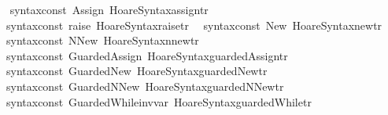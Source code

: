 \begin{isabellebody}
{\isacartoucheclose}\isanewline
\isanewline
\isanewline
\isanewline
{}\isamarkupfalse%
\ {\isacartoucheopen}\isanewline
\ {\isacharbrackleft}{\isacharparenleft}{\isacharat}{\isacharbraceleft}syntax{\isacharunderscore}const\ {\isachardoublequote}{\isacharunderscore}Assign{\isachardoublequote}{\isacharbraceright}{\isacharcomma}\ Hoare{\isacharunderscore}Syntax{\isachardot}assign{\isacharunderscore}tr{\isacharparenright}{\isacharcomma}\isanewline
\ \ {\isacharparenleft}{\isacharat}{\isacharbraceleft}syntax{\isacharunderscore}const\ {\isachardoublequote}{\isacharunderscore}raise{\isachardoublequote}{\isacharbraceright}{\isacharcomma}\ Hoare{\isacharunderscore}Syntax{\isachardot}raise{\isacharunderscore}tr{\isacharparenright}{\isacharcomma}\isanewline
\ \ {\isacharparenleft}{\isacharat}{\isacharbraceleft}syntax{\isacharunderscore}const\ {\isachardoublequote}{\isacharunderscore}New{\isachardoublequote}{\isacharbraceright}{\isacharcomma}\ Hoare{\isacharunderscore}Syntax{\isachardot}new{\isacharunderscore}tr{\isacharparenright}{\isacharcomma}\isanewline
\ \ {\isacharparenleft}{\isacharat}{\isacharbraceleft}syntax{\isacharunderscore}const\ {\isachardoublequote}{\isacharunderscore}NNew{\isachardoublequote}{\isacharbraceright}{\isacharcomma}\ Hoare{\isacharunderscore}Syntax{\isachardot}nnew{\isacharunderscore}tr{\isacharparenright}{\isacharcomma}\isanewline
\ \ {\isacharparenleft}{\isacharat}{\isacharbraceleft}syntax{\isacharunderscore}const\ {\isachardoublequote}{\isacharunderscore}GuardedAssign{\isachardoublequote}{\isacharbraceright}{\isacharcomma}\ Hoare{\isacharunderscore}Syntax{\isachardot}guarded{\isacharunderscore}Assign{\isacharunderscore}tr{\isacharparenright}{\isacharcomma}\isanewline
\ \ {\isacharparenleft}{\isacharat}{\isacharbraceleft}syntax{\isacharunderscore}const\ {\isachardoublequote}{\isacharunderscore}GuardedNew{\isachardoublequote}{\isacharbraceright}{\isacharcomma}\ Hoare{\isacharunderscore}Syntax{\isachardot}guarded{\isacharunderscore}New{\isacharunderscore}tr{\isacharparenright}{\isacharcomma}\isanewline
\ \ {\isacharparenleft}{\isacharat}{\isacharbraceleft}syntax{\isacharunderscore}const\ {\isachardoublequote}{\isacharunderscore}GuardedNNew{\isachardoublequote}{\isacharbraceright}{\isacharcomma}\ Hoare{\isacharunderscore}Syntax{\isachardot}guarded{\isacharunderscore}NNew{\isacharunderscore}tr{\isacharparenright}{\isacharcomma}\isanewline
\ \ {\isacharparenleft}{\isacharat}{\isacharbraceleft}syntax{\isacharunderscore}const\ {\isachardoublequote}{\isacharunderscore}GuardedWhile{\isacharunderscore}inv{\isacharunderscore}var{\isachardoublequote}{\isacharbraceright}{\isacharcomma}\ Hoare{\isacharunderscore}Syntax{\isachardot}guarded{\isacharunderscore}While{\isacharunderscore}tr{\isacharparenright}{\isacharcomma}\isanewline

\end{isabellebody}
